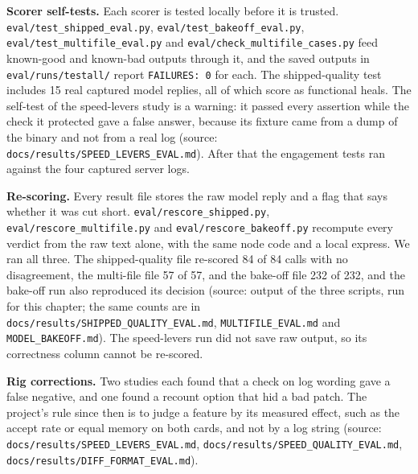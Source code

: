 \textbf{Scorer self-tests.} Each scorer is tested locally before it is trusted. \texttt{eval/\allowbreak{}test\_\allowbreak{}shipped\_\allowbreak{}eval.\allowbreak{}py}, \texttt{eval/\allowbreak{}test\_\allowbreak{}bakeoff\_\allowbreak{}eval.\allowbreak{}py}, \texttt{eval/\allowbreak{}test\_\allowbreak{}multifile\_\allowbreak{}eval.\allowbreak{}py} and \texttt{eval/\allowbreak{}check\_\allowbreak{}multifile\_\allowbreak{}cases.\allowbreak{}py} feed known-good and known-bad outputs through it, and the saved outputs in \texttt{eval/\allowbreak{}runs/\allowbreak{}testall/\allowbreak{}} report \texttt{FAILURES:\allowbreak{} 0} for each. The shipped-quality test includes 15 real captured model replies, all of which score as functional heals. The self-test of the speed-levers study is a warning: it passed every assertion while the check it protected gave a false answer, because its fixture came from a dump of the binary and not from a real log (source: \texttt{docs/\allowbreak{}results/\allowbreak{}SPEED\_\allowbreak{}LEVERS\_\allowbreak{}EVAL.\allowbreak{}md}). After that the engagement tests ran against the four captured server logs.

\textbf{Re-scoring.} Every result file stores the raw model reply and a flag that says whether it was cut short. \texttt{eval/\allowbreak{}rescore\_\allowbreak{}shipped.\allowbreak{}py}, \texttt{eval/\allowbreak{}rescore\_\allowbreak{}multifile.\allowbreak{}py} and \texttt{eval/\allowbreak{}rescore\_\allowbreak{}bakeoff.\allowbreak{}py} recompute every verdict from the raw text alone, with the same node code and a local express. We ran all three. The shipped-quality file re-scored 84 of 84 calls with no disagreement, the multi-file file 57 of 57, and the bake-off file 232 of 232, and the bake-off run also reproduced its decision (source: output of the three scripts, run for this chapter; the same counts are in \texttt{docs/\allowbreak{}results/\allowbreak{}SHIPPED\_\allowbreak{}QUALITY\_\allowbreak{}EVAL.\allowbreak{}md}, \texttt{MULTIFILE\_\allowbreak{}EVAL.\allowbreak{}md} and \texttt{MODEL\_\allowbreak{}BAKEOFF.\allowbreak{}md}). The speed-levers run did not save raw output, so its correctness column cannot be re-scored.

\textbf{Rig corrections.} Two studies each found that a check on log wording gave a false negative, and one found a recount option that hid a bad patch. The project's rule since then is to judge a feature by its measured effect, such as the accept rate or equal memory on both cards, and not by a log string (source: \texttt{docs/\allowbreak{}results/\allowbreak{}SPEED\_\allowbreak{}LEVERS\_\allowbreak{}EVAL.\allowbreak{}md}, \texttt{docs/\allowbreak{}results/\allowbreak{}SPEED\_\allowbreak{}QUALITY\_\allowbreak{}EVAL.\allowbreak{}md}, \texttt{docs/\allowbreak{}results/\allowbreak{}DIFF\_\allowbreak{}FORMAT\_\allowbreak{}EVAL.\allowbreak{}md}).

